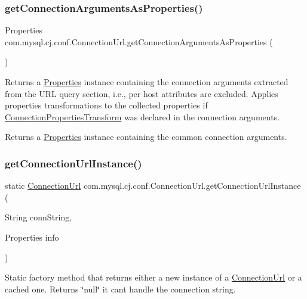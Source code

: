 \subsubsection{\texorpdfstring{get\+Connection\+Arguments\+As\+Properties()}{getConnectionArgumentsAsProperties()}}
{\footnotesize\ttfamily Properties com.\+mysql.\+cj.\+conf.\+Connection\+Url.\+get\+Connection\+Arguments\+As\+Properties (\begin{DoxyParamCaption}{ }\end{DoxyParamCaption})}

Returns a \mbox{\hyperlink{}{Properties}} instance containing the connection arguments extracted from the U\+RL query section, i.\+e., per host attributes are excluded. Applies properties transformations to the collected properties if \mbox{\hyperlink{interfacecom_1_1mysql_1_1cj_1_1conf_1_1_connection_properties_transform}{Connection\+Properties\+Transform}} was declared in the connection arguments.

\begin{DoxyReturn}{Returns}
a \mbox{\hyperlink{}{Properties}} instance containing the common connection arguments. 
\end{DoxyReturn}
\mbox{\label{classcom_1_1mysql_1_1cj_1_1conf_1_1_connection_url_af7958a22bfdda05d3b62f6149efed678}} 
\subsubsection{\texorpdfstring{get\+Connection\+Url\+Instance()}{getConnectionUrlInstance()}}
{\footnotesize\ttfamily static \mbox{\hyperlink{classcom_1_1mysql_1_1cj_1_1conf_1_1_connection_url}{Connection\+Url}} com.\+mysql.\+cj.\+conf.\+Connection\+Url.\+get\+Connection\+Url\+Instance (\begin{DoxyParamCaption}\item[{String}]{conn\+String,  }\item[{Properties}]{info }\end{DoxyParamCaption})\hspace{0.3cm}{\ttfamily [static]}}

Static factory method that returns either a new instance of a \mbox{\hyperlink{classcom_1_1mysql_1_1cj_1_1conf_1_1_connection_url}{Connection\+Url}} or a cached one. Returns \char`\"{}null\char`\"{} it can\textquotesingle{}t handle the connection string.


